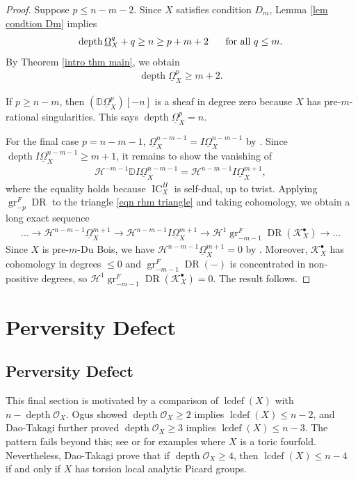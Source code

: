 \documentclass[11pt]{amsart}
\theoremstyle{definition}
\theoremstyle{plain}
\newcounter{intro}
\DeclareMathOperator{\gr}{gr}
\DeclareMathOperator{\dr}{DR}
\DeclareMathOperator{\ic}{IC}
\DeclareMathOperator{\lcdef}{lcdef}
\DeclareMathOperator{\depth}{depth}
\begin{document}
\begin{proof}
Suppose $p \leq n-m-2$. Since $X$ satisfies condition $D_m$, Lemma \ref{lem condtion Dm} implies
\begin{align*}
    \depth \underline{\Omega}_X^q + q \geq n \geq p+m+2 \hspace{.5cm} \text{ for all } q \leq m.
\end{align*}
By Theorem \ref{intro thm main}, we obtain
\begin{align*}
    \depth \underline{\Omega}_X^p \geq m+2.
\end{align*}

If $p \geq n-m$, then $(\mathbb{D} \underline{\Omega}_X^p)[-n]$ is a sheaf in degree zero because $X$ has pre-$m$-rational singularities. This says $\depth \underline{\Omega}_X^p = n$.

For the final case $p = n-m-1$, $\underline{\Omega}_X^{n-m-1} = I\underline{\Omega}_X^{n-m-1}$ by \cite[Proposition $7.4$]{popa park lefschetz}. Since $\depth I \underline{\Omega}_X^{n-m-1} \geq m+1$, it remains to show the vanishing of
\begin{align*}
    \mathcal{H}^{-m-1} \mathbb{D} I \underline{\Omega}_X^{n-m-1} = \mathcal{H}^{n-m-1} I \underline{\Omega}_X^{m+1},
\end{align*}
where the equality holds because $\ic_X^H$ is self-dual, up to twist. Applying $\gr_{-p}^F \dr$ to the triangle \ref{eqn rhm triangle} and taking cohomology, we obtain a long exact sequence
\begin{align*}
    \ldots \rightarrow \mathcal{H}^{n-m-1} \underline{\Omega}_X^{m+1} \rightarrow \mathcal{H}^{n-m-1} I \underline{\Omega}_X^{m+1} \rightarrow \mathcal{H}^1 \gr_{-m-1}^F \dr( \mathcal{K}_X^\bullet) \rightarrow \ldots
\end{align*}
Since $X$ is pre-$m$-Du Bois, we have $\mathcal{H}^{n-m-1} \underline{\Omega}_X^{m+1} = 0$ by \cite[Proposition C]{psv}. Moreover, $\mathcal{K}_X^\bullet$ has cohomology in degrees $\leq 0$ and $\gr_{-m-1}^F \dr(-)$ is concentrated in non-positive degrees, so $\mathcal{H}^1 \gr_{-m-1}^F \dr( \mathcal{K}_X^\bullet) = 0$. The result follows.
\end{proof}



\section{Perversity Defect}\label{section final}

\subsection{Perversity Defect}
This final section is motivated by a comparison of $\lcdef(X)$ with $n - \depth \mathscr{O}_X$. Ogus \cite{ogus} showed $\depth \mathscr{O}_X \geq 2$ implies $\lcdef(X) \leq n-2$, and Dao-Takagi \cite{dao takagi} further proved $\depth \mathscr{O}_X \geq 3$ implies $\lcdef(X) \leq n-3$. The pattern fails beyond this; see \cite[Example $2.11$]{dao takagi} or \cite{kim venkatesh} for examples where $X$ is a toric fourfold. Nevertheless, Dao-Takagi prove that if $\depth \mathscr{O}_X \geq 4$, then $\lcdef(X) \leq n-4$ if and only if $X$ has torsion local analytic Picard groups. 
\end{document}
